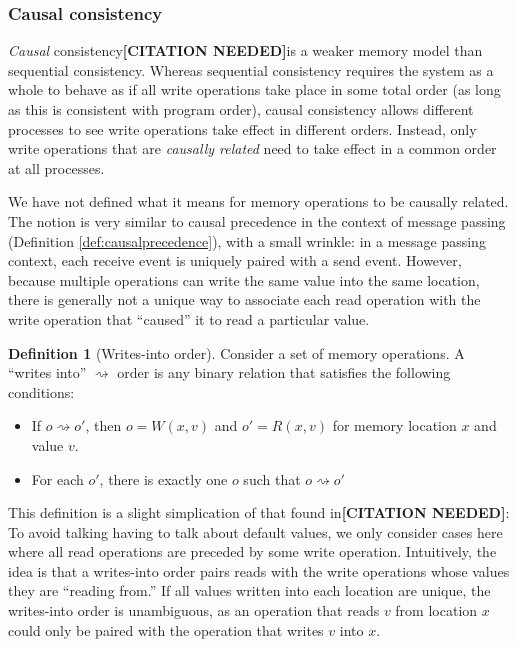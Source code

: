 \documentclass[]             %
{NASA}                       %
\theoremstyle{definition}
\newtheorem{definition}{Definition}[section]
\newcommand{\citationneeded}{\textbf{[CITATION NEEDED]}}
\begin{document}
\subsubsection{Causal consistency}
\label{causal-consistency}

\emph{Causal} consistency\citationneeded is a weaker memory model than
sequential consistency. Whereas sequential consistency requires the
system as a whole to behave as if all write operations take place in
some total order (as long as this is consistent with program order),
causal consistency allows different processes to see write operations
take effect in different orders. Instead, only write operations that
are \emph{causally related} need to take effect in a common order
at all processes.

We have not defined what it means for memory operations to be causally
related. The notion is very similar to causal precedence in the
context of message passing (Definition \ref{def:causalprecedence}),
with a small wrinkle: in a message passing context, each receive event
is uniquely paired with a send event. However, because multiple
operations can write the same value into the same location, there is
generally not a unique way to associate each read operation with the
write operation that ``caused'' it to read a particular value.

\begin{definition}[Writes-into order]
  Consider a set of memory operations. A ``writes into''
  $\rightsquigarrow$ order is any binary relation that satisfies the
  following conditions:
  \begin{itemize}
  \item If $o \rightsquigarrow o'$, then $o = W(x, v)$ and $o' = R(x,v)$ for memory location $x$ and value $v$.
  \item For each $o'$, there is exactly one $o$ such that $o \rightsquigarrow o'$
  \end{itemize}
\end{definition}

This definition is a slight simplication of that found
in\citationneeded: To avoid talking having to talk about default
values, we only consider cases here where all read operations are
preceded by some write operation. Intuitively, the idea is that a
writes-into order pairs reads with the write operations whose values
they are ``reading from.'' If all values written into each location
are unique, the writes-into order is unambiguous, as an operation that
reads $v$ from location $x$ could only be paired with the operation
that writes $v$ into $x$.
\end{document}
